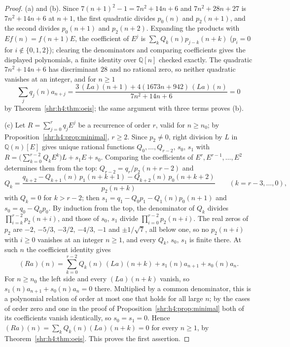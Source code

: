 \documentclass[11pt,letterpaper]{article}
\numberwithin{equation}{section}
\theoremstyle{definition}
\newcommand{\Q}{\mathbb Q}
\newcommand{\1}{\mathbf 1}
\begin{document}
\begin{proof}
(a) and (b). Since $7(n+1)^2-1=7n^2+14n+6$ and $7n^2+28n+27$ is
$7n^2+14n+6$ at $n+1$, the first quadratic divides $p_0(n)$ and
$p_2(n+1)$, and the second divides $p_0(n+1)$ and $p_2(n+2)$. Expanding the products with $Ef(n)=f(n+1)E$,
the coefficient of $E^j$ is $\sum_kQ_k(n)p_{j-k}(n+k)$ ($p_i=0$ for
$i\notin\{0,1,2\}$); clearing the denominators and comparing coefficients
gives the displayed polynomials, a finite identity over $\Q[n]$ checked
exactly. The quadratic $7n^2+14n+6$ has discriminant $28$ and no rational
zero, so neither quadratic vanishes at an integer, and for $n\ge1$
\[
 \sum_jq_j(n)a_{n+j}=\frac{3\,(La)(n+1)+4(1673n+942)\,(La)(n)}{7n^2+14n+6}=0
\]
by Theorem~\ref{shr:h4:thm:oeis}; the same argument with three terms
proves (b).

(c) Let $R=\sum_{j=0}^rq_jE^j$ be a recurrence of order $r$, valid for
$n\ge n_0$; by Proposition~\ref{shr:h4:prop:minimal}, $r\ge2$. Since $p_2\ne0$,
right division by $L$ in $\Q(n)[E]$ gives unique rational functions
$Q_0,\ldots,Q_{r-2}$, $s_0$, $s_1$ with
$R=\bigl(\sum_{k=0}^{r-2}Q_kE^k\bigr)L+s_1E+s_0$. Comparing the
coefficients of $E^{r},E^{r-1},\ldots,E^2$ determines them from the top:
$Q_{r-2}=q_r/p_2(n+r-2)$ and
\[
 Q_k=\frac{q_{k+2}-Q_{k+1}(n)\,p_1(n+k+1)-Q_{k+2}(n)\,p_0(n+k+2)}{p_2(n+k)}
 \qquad(k=r-3,\ldots,0),
\]
with $Q_k=0$ for $k>r-2$; then $s_1=q_1-Q_0p_1-Q_1(n)p_0(n+1)$ and
$s_0=q_0-Q_0p_0$. By induction from the top, the denominator of $Q_k$
divides $\prod_{i=k}^{r-2}p_2(n+i)$, and those of $s_0$, $s_1$ divide
$\prod_{i=0}^{r-2}p_2(n+i)$. The real zeros of $p_2$ are $-2$, $-5/3$,
$-3/2$, $-4/3$, $-1$ and $\pm1/\sqrt7$, all below one, so no
$p_2(n+i)$ with $i\ge0$ vanishes at an integer $n\ge1$, and every $Q_k$,
$s_0$, $s_1$ is finite there. At such $n$ the coefficient identity gives
\[
 (Ra)(n)=\sum_{k=0}^{r-2}Q_k(n)\,(La)(n+k)+s_1(n)a_{n+1}+s_0(n)a_n .
\]
For $n\ge n_0$ the left side and every $(La)(n+k)$ vanish, so
$s_1(n)a_{n+1}+s_0(n)a_n=0$ there. Multiplied by a common denominator,
this is a polynomial relation of order at most one that holds for all
large $n$; by the cases of order zero and one in the proof of
Proposition~\ref{shr:h4:prop:minimal} both of its coefficients vanish
identically, so $s_0=s_1=0$. Hence
$(Ra)(n)=\sum_kQ_k(n)(La)(n+k)=0$ for every $n\ge1$, by
Theorem~\ref{shr:h4:thm:oeis}. This proves the first assertion.


\end{proof}
\end{document}
